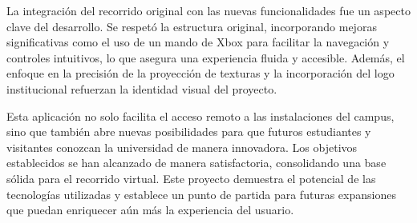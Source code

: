 \documentclass[conference]{IEEEtran}
\begin{document}
La integración del recorrido original con las nuevas funcionalidades fue un aspecto clave del desarrollo. Se respetó la estructura original, incorporando mejoras significativas como el uso de un mando de Xbox para facilitar la navegación y controles intuitivos, lo que asegura una experiencia fluida y accesible. Además, el enfoque en la precisión de la proyección de texturas y la incorporación del logo institucional refuerzan la identidad visual del proyecto.

Esta aplicación no solo facilita el acceso remoto a las instalaciones del campus, sino que también abre nuevas posibilidades para que futuros estudiantes y visitantes conozcan la universidad de manera innovadora. Los objetivos establecidos se han alcanzado de manera satisfactoria, consolidando una base sólida para el recorrido virtual. Este proyecto demuestra el potencial de las tecnologías utilizadas y establece un punto de partida para futuras expansiones que puedan enriquecer aún más la experiencia del usuario. 

\printbibliography
\end{document}
